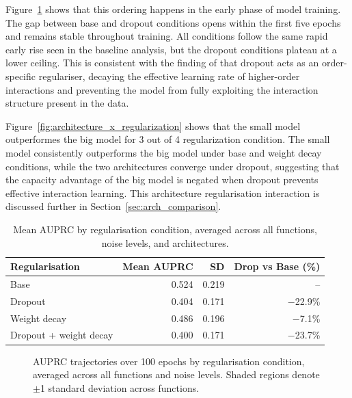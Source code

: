 \documentclass{article}
\begin{document}
Figure~\ref{fig:auprc_by_regularization} shows that this ordering happens in the early phase of model training.
The gap between base and dropout conditions opens within the first five epochs and remains stable throughout training.
All conditions follow the same rapid early rise seen in the baseline
analysis, but the dropout conditions plateau at a lower ceiling. This is
consistent with the finding of \cite{lengerich2021dropoutregularizerinteractioneffects}
that dropout acts as an order-specific regulariser, decaying the effective
learning rate of higher-order interactions and preventing the model from
fully exploiting the interaction structure present in the data.

Figure~\ref{fig:architecture_x_regularization} shows that the small model outperformes the big model for 3 out of 4 regularization condition.
The small model consistently outperforms the big model under base and weight decay
conditions, while the two architectures converge under dropout, suggesting
that the capacity advantage of the big model is negated when dropout
prevents effective interaction learning. This architecture regularisation
interaction is discussed further in Section~\ref{sec:arch_comparison}.

\begin{table}[htbp]
\centering
\caption{Mean AUPRC by regularisation condition, averaged across
all functions, noise levels, and architectures.}
\label{tab:auprc_by_regularization}
\begin{tabular}{lrrr}
\toprule
Regularisation & Mean AUPRC & SD & Drop vs Base (\%) \\
\midrule
Base                   & 0.524 & 0.219 & -- \\
Dropout                & 0.404 & 0.171 & $-$22.9\% \\
Weight decay           & 0.486 & 0.196 & $-$7.1\% \\
Dropout + weight decay & 0.400 & 0.171 & $-$23.7\% \\
\bottomrule
\end{tabular}
\end{table}

\begin{figure}[htbp]
    \centering
    
    \caption{AUPRC trajectories over 100 epochs by regularisation
    condition, averaged across all functions and noise levels. Shaded regions
    denote $\pm$1 standard deviation across functions.}
    \label{fig:auprc_by_regularization}
\end{figure}
\end{document}
